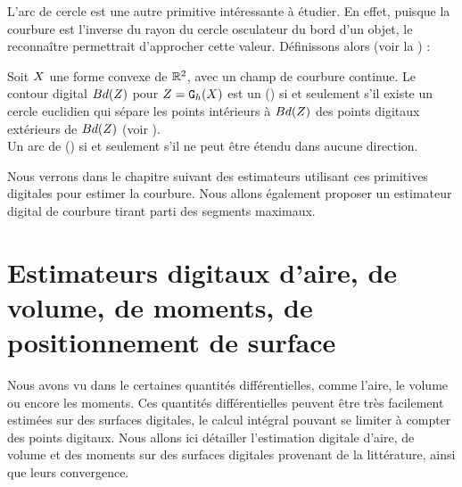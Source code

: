 L'arc de cercle est une autre primitive intéressante à étudier. En effet,
puisque la courbure est l'inverse du rayon du cercle osculateur du bord d'un
objet, le reconnaître permettrait d'approcher cette valeur. Définissons alors
 (voir la ) :
%
\begin{definition}{}
  \label{def:digital-circular-arc}
  Soit $X$ une forme convexe de $\mathbb{R}^2$, avec un champ de courbure continue.
  Le contour digital $Bd({Z})$ pour $Z = \mathtt{G}_{h}(X)$ est un  () si et seulement s'il existe un cercle euclidien
  qui sépare les points intérieurs à $Bd({Z})$ des points digitaux
  extérieurs de $Bd({Z})$ (voir ).
  \\
  Un arc de  () si et seulement s'il ne
  peut être étendu dans aucune direction.
\end{definition}


Nous verrons dans le chapitre suivant des estimateurs utilisant ces primitives
digitales pour estimer la courbure. Nous allons également proposer un estimateur
digital de courbure tirant parti des segments maximaux.
%
\section{Estimateurs digitaux d'aire, de volume, de moments, de positionnement de surface}
%
Nous avons vu dans le  certaines quantités
différentielles, comme l'aire, le volume ou encore les moments. Ces quantités
différentielles peuvent être très facilement estimées sur des surfaces
digitales, le calcul intégral pouvant se limiter à compter des points digitaux.
Nous allons ici détailler l'estimation digitale d'aire, de volume et des moments
sur des surfaces digitales provenant de la littérature, ainsi que leurs
convergence.
%
